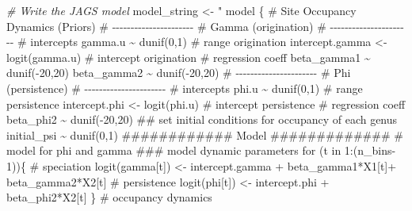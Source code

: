 \documentclass[
]{article}
\newenvironment{Shaded}{\begin{snugshade}}{\end{snugshade}}
\newcommand{\CommentTok}[1]{\textcolor[rgb]{0.56,0.35,0.01}{\textit{#1}}}
\newcommand{\NormalTok}[1]{#1}
\newcommand{\OtherTok}[1]{\textcolor[rgb]{0.56,0.35,0.01}{#1}}
\newcommand{\StringTok}[1]{\textcolor[rgb]{0.31,0.60,0.02}{#1}}
\begin{document}
{\begin{Shaded}
\begin{Highlighting}[]
\CommentTok{\# Write the JAGS model}
\NormalTok{model\_string }\OtherTok{\textless{}{-}} \StringTok{"}
\StringTok{model \{}
\StringTok{  }
\StringTok{      \# Site Occupancy Dynamics (Priors)}
\StringTok{       }
\StringTok{       }
\StringTok{        \# {-}{-}{-}{-}{-}{-}{-}{-}{-}{-}{-}{-}{-}{-}{-}{-}{-}{-}{-}{-}{-}{-}}
\StringTok{        \#     Gamma (origination)}
\StringTok{        \# {-}{-}{-}{-}{-}{-}{-}{-}{-}{-}{-}{-}{-}{-}{-}{-}{-}{-}{-}{-}{-}{-}}
\StringTok{        }
\StringTok{        \# intercepts}
\StringTok{        gamma.u \textasciitilde{} dunif(0,1) \# range origination}
\StringTok{        intercept.gamma \textless{}{-} logit(gamma.u) \# intercept origination}
\StringTok{        \# regression coeff}
\StringTok{        beta\_gamma1 \textasciitilde{} dunif({-}20,20)}
\StringTok{        beta\_gamma2 \textasciitilde{} dunif({-}20,20)}
\StringTok{        }
\StringTok{        \# {-}{-}{-}{-}{-}{-}{-}{-}{-}{-}{-}{-}{-}{-}{-}{-}{-}{-}{-}{-}{-}{-}}
\StringTok{        \#     Phi (persistence)}
\StringTok{        \# {-}{-}{-}{-}{-}{-}{-}{-}{-}{-}{-}{-}{-}{-}{-}{-}{-}{-}{-}{-}{-}{-}}
\StringTok{        \# intercepts}
\StringTok{        phi.u \textasciitilde{} dunif(0,1) \# range persistence}
\StringTok{        intercept.phi \textless{}{-} logit(phi.u) \# intercept persistence}
\StringTok{        \# regression coeff}
\StringTok{        beta\_phi2 \textasciitilde{} dunif({-}20,20)}
\StringTok{        }
\StringTok{        }
\StringTok{        \#\# set initial conditions for occupancy of each genus}
\StringTok{        initial\_psi \textasciitilde{} dunif(0,1)}
\StringTok{        }
\StringTok{           }
\StringTok{       \#\#\#\#\#\#\#\#\#\#\#\#      Model       \#\#\#\#\#\#\#\#\#\#\#\#\#}
\StringTok{       }
\StringTok{       \# model for phi and gamma}
\StringTok{       \#\#\# model dynamic parameters}
\StringTok{        }
\StringTok{        for (t in 1:(n\_bins{-}1))\{}
\StringTok{      }
\StringTok{             \# speciation}
\StringTok{             logit(gamma[t]) \textless{}{-}  intercept.gamma + }
\StringTok{                                   beta\_gamma1*X1[t]+}
\StringTok{                                   beta\_gamma2*X2[t]}
\StringTok{                                   }
\StringTok{              \# persistence}
\StringTok{              logit(phi[t]) \textless{}{-}  intercept.phi + }
\StringTok{                                  beta\_phi2*X2[t]}
\StringTok{                                  }
\StringTok{                                  }
\StringTok{        \}}
\StringTok{        }
\StringTok{       }
\StringTok{                       }
\StringTok{      \# occupancy dynamics}

\end{Highlighting}
\end{Shaded}}
\end{document}
